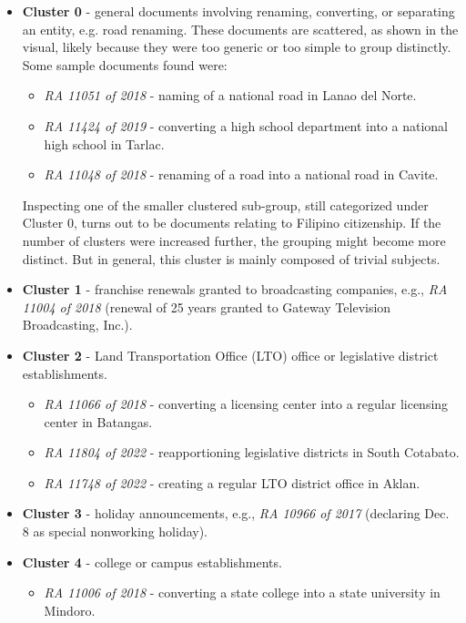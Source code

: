 \documentclass[conference]{IEEEtran}
\begin{document}
\begin{itemize}
    \item \textbf{Cluster 0} - general documents involving renaming, converting, or separating an entity, e.g. road renaming. These documents are scattered, as shown in the visual, likely because they were too generic or too simple to group distinctly. Some sample documents found were:
    \begin{itemize}
        \item \textit{RA 11051 of 2018} - naming of a national road in Lanao del Norte.
        \item \textit{RA 11424 of 2019} - converting a high school department into a national high school in Tarlac.
        \item \textit{RA 11048 of 2018} - renaming of a road into a national road in Cavite.
    \end{itemize}
    Inspecting one of the smaller clustered sub-group, still categorized under Cluster 0, turns out to be documents relating to Filipino citizenship. If the number of clusters were increased further, the grouping might become more distinct. But in general, this cluster is mainly composed of trivial subjects.
    \item \textbf{Cluster 1} - franchise renewals granted to broadcasting companies, e.g., \textit{RA 11004 of 2018} (renewal of 25 years granted to Gateway Television Broadcasting, Inc.).
    \item \textbf{Cluster 2} - Land Transportation Office (LTO) office or legislative district establishments.
    \begin{itemize}
        \item \textit{RA 11066 of 2018} - converting a licensing center into a regular licensing center in Batangas.
        \item \textit{RA 11804 of 2022} - reapportioning legislative districts in South Cotabato.
        \item \textit{RA 11748 of 2022} - creating a regular LTO district office in Aklan.
    \end{itemize}
    \item \textbf{Cluster 3} - holiday announcements, e.g., \textit{RA 10966 of 2017} (declaring Dec. 8 as special nonworking holiday).
    \item \textbf{Cluster 4} - college or campus establishments.
    \begin{itemize}
        \item \textit{RA 11006 of 2018} - converting a state college into a state university in Mindoro.

\end{itemize}
\end{itemize}
\end{document}
